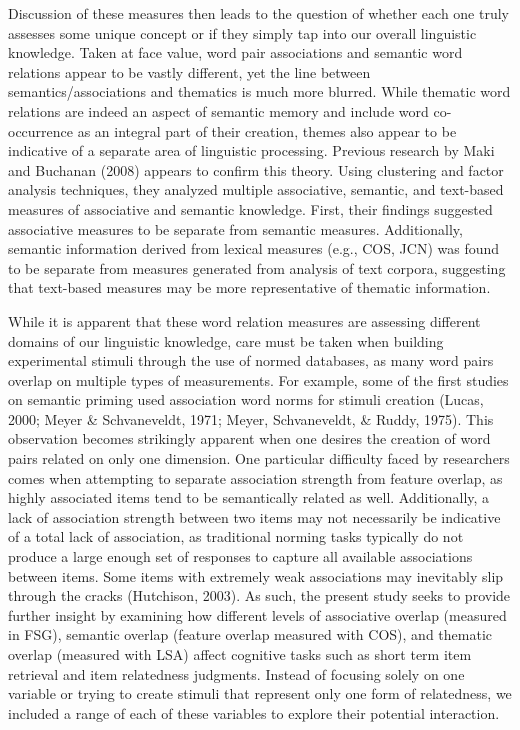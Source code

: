 \documentclass[english,man]{apa6}
\theoremstyle{definition}
\theoremstyle{definition}
\theoremstyle{definition}
\theoremstyle{remark}
\begin{document}
Discussion of these measures then leads to the question of whether each
one truly assesses some unique concept or if they simply tap into our
overall linguistic knowledge. Taken at face value, word pair
associations and semantic word relations appear to be vastly different,
yet the line between semantics/associations and thematics is much more
blurred. While thematic word relations are indeed an aspect of semantic
memory and include word co-occurrence as an integral part of their
creation, themes also appear to be indicative of a separate area of
linguistic processing. Previous research by Maki and Buchanan (2008)
appears to confirm this theory. Using clustering and factor analysis
techniques, they analyzed multiple associative, semantic, and text-based
measures of associative and semantic knowledge. First, their findings
suggested associative measures to be separate from semantic measures.
Additionally, semantic information derived from lexical measures (e.g.,
COS, JCN) was found to be separate from measures generated from analysis
of text corpora, suggesting that text-based measures may be more
representative of thematic information.

While it is apparent that these word relation measures are assessing
different domains of our linguistic knowledge, care must be taken when
building experimental stimuli through the use of normed databases, as
many word pairs overlap on multiple types of measurements. For example,
some of the first studies on semantic priming used association word
norms for stimuli creation (Lucas, 2000; Meyer \& Schvaneveldt, 1971;
Meyer, Schvaneveldt, \& Ruddy, 1975). This observation becomes
strikingly apparent when one desires the creation of word pairs related
on only one dimension. One particular difficulty faced by researchers
comes when attempting to separate association strength from feature
overlap, as highly associated items tend to be semantically related as
well. Additionally, a lack of association strength between two items may
not necessarily be indicative of a total lack of association, as
traditional norming tasks typically do not produce a large enough set of
responses to capture all available associations between items. Some
items with extremely weak associations may inevitably slip through the
cracks (Hutchison, 2003). As such, the present study seeks to provide
further insight by examining how different levels of associative overlap
(measured in FSG), semantic overlap (feature overlap measured with COS),
and thematic overlap (measured with LSA) affect cognitive tasks such as
short term item retrieval and item relatedness judgments. Instead of
focusing solely on one variable or trying to create stimuli that
represent only one form of relatedness, we included a range of each of
these variables to explore their potential interaction.
\end{document}
